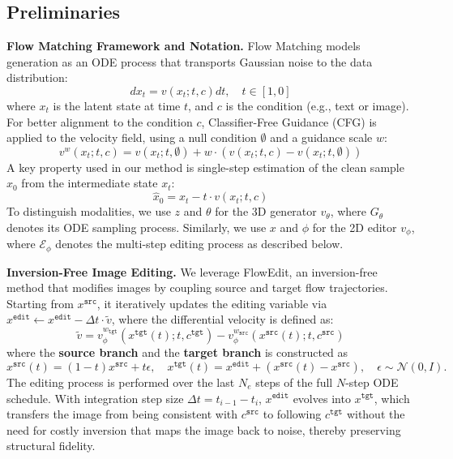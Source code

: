 \documentclass[runningheads]{llncs}
\begin{document}
\subsection{Preliminaries}
\label{sec:preliminaries}
\textbf{Flow Matching Framework and Notation.}
Flow Matching models generation as an ODE process that transports Gaussian noise to the data distribution:
\begin{equation}
    dx_t = v(x_t; t, c) dt, \quad t \in [1, 0]
\end{equation}
where $x_t$ is the latent state at time $t$, and $c$ is the condition (e.g., text or image).
For better alignment to the condition $c$, Classifier-Free Guidance (CFG) is applied to the velocity field, using a null condition $\emptyset$ and a guidance scale $w$:
\begin{equation}
    \label{eq:cfg_guidance}
    v^{w}(x_t; t, c) = v(x_t; t, \emptyset) + w \cdot (v(x_t; t, c) - v(x_t; t, \emptyset))
\end{equation}
A key property used in our method is single-step estimation of the clean sample $\hat{x}_0$ from the intermediate state $x_t$:
\begin{equation}
    \label{eq:single_step_estimation}
    \hat{x}_0 = x_t - t \cdot v(x_t; t, c)
\end{equation}
To distinguish modalities, we use $z$ and $\theta$ for the 3D generator $v_\theta$, where $G_\theta$ denotes its ODE sampling process.
Similarly, we use $x$ and $\phi$ for the 2D editor $v_\phi$, where $\mathcal{E}_\phi$ denotes the multi-step editing process as described below.



\textbf{Inversion-Free Image Editing.}
We leverage FlowEdit, an inversion-free method that modifies images by coupling source and target flow trajectories.
Starting from $x^{\texttt{src}}$, it iteratively updates the editing variable via $x^{\texttt{edit}} \leftarrow x^{\texttt{edit}} - \Delta t \cdot \tilde{v}$, where the differential velocity is defined as:
\begin{equation}
    \label{eq:flowedit_transition}
    \tilde{v} = v_\phi^{w_{\texttt{tgt}}}(x^{\texttt{tgt}}(t); t, c^{\texttt{tgt}}) - v_\phi^{w_{\texttt{src}}}(x^{\texttt{src}}(t); t, c^{\texttt{src}})
\end{equation}
where the \textbf{source branch} and the \textbf{target branch} is constructed as
\begin{equation}
    \label{eq:flowedit_states}
    x^{\texttt{src}}(t) = (1-t)x^{\texttt{src}} + t\epsilon, \quad x^{\texttt{tgt}}(t) = x^{\texttt{edit}} + (x^{\texttt{src}}(t) - x^{\texttt{src}}), \quad \epsilon \sim \mathcal{N}(0, I).
\end{equation}
The editing process is performed over the last $N_e$ steps of the full $N$-step ODE schedule.
With integration step size $\Delta t = t_{i-1} - t_i$, $x^{\texttt{edit}}$ evolves into $x^{\texttt{tgt}}$, which transfers the image from being consistent with $c^{\texttt{src}}$ to following $c^{\texttt{tgt}}$ without the need for costly inversion that maps the image back to noise, thereby preserving structural fidelity.
\end{document}

